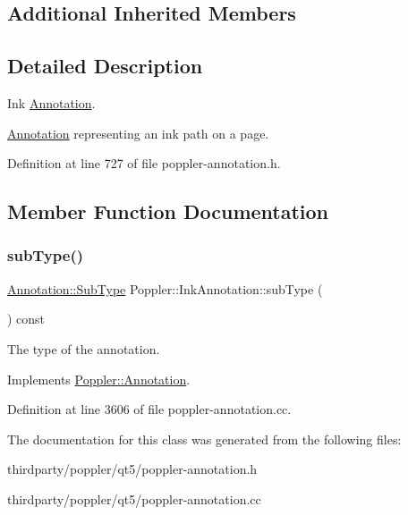 \subsection*{Additional Inherited Members}


\subsection{Detailed Description}
Ink \hyperlink{class_poppler_1_1_annotation}{Annotation}. 

\hyperlink{class_poppler_1_1_annotation}{Annotation} representing an ink path on a page. 

Definition at line 727 of file poppler-\/annotation.\+h.



\subsection{Member Function Documentation}
\mbox{\label{class_poppler_1_1_ink_annotation_a800926980dc58d7b1d805f0ca8bab73f}} 
\subsubsection{\texorpdfstring{sub\+Type()}{subType()}}
{\footnotesize\ttfamily \hyperlink{class_poppler_1_1_annotation_a2d592999c330949d64679cfa9e81113f}{Annotation\+::\+Sub\+Type} Poppler\+::\+Ink\+Annotation\+::sub\+Type (\begin{DoxyParamCaption}{ }\end{DoxyParamCaption}) const\hspace{0.3cm}{\ttfamily [virtual]}}

The type of the annotation. 

Implements \hyperlink{class_poppler_1_1_annotation_aef7fa1532193b41fbeba6e577579d984}{Poppler\+::\+Annotation}.



Definition at line 3606 of file poppler-\/annotation.\+cc.



The documentation for this class was generated from the following files\+:\begin{DoxyCompactItemize}
\item 
thirdparty/poppler/qt5/poppler-\/annotation.\+h\item 
thirdparty/poppler/qt5/poppler-\/annotation.\+cc\end{DoxyCompactItemize}
